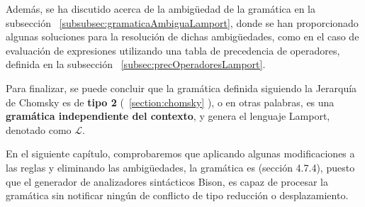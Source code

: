 Además, se ha discutido acerca de la ambigüedad de la gramática en la subsección ~\ref{subsubsec:gramaticaAmbiguaLamport}, donde se han proporcionado algunas soluciones para la resolución de dichas ambigüedades, como en el caso de evaluación de expresiones utilizando una tabla de precedencia de operadores, definida en la subsección ~\ref{subsec:precOperadoresLamport}.



Para finalizar, se puede concluir que la gramática definida siguiendo la Jerarquía de Chomsky es de \textbf{tipo 2} (~\ref{section:chomsky} ), o en otras palabras, es una \textbf{gramática independiente del contexto}, y genera el lenguaje Lamport, denotado como $\mathscr{L}$.



En el siguiente capítulo, comprobaremos que aplicando algunas modificaciones a las reglas y eliminando las ambigüedades, la gramática es  \cite{aho1990compiladores} (sección 4.7.4), puesto que el generador de analizadores sintácticos Bison, es capaz de procesar la gramática sin notificar ningún de conflicto de tipo reducción o desplazamiento.

